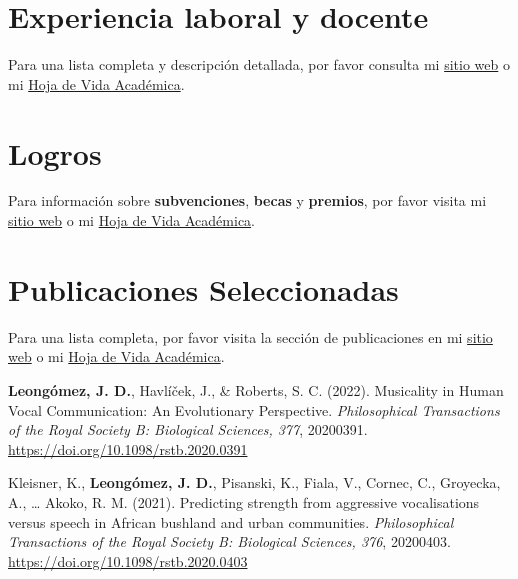 \documentclass[11pt,a4paper,]{awesome-cv}
\begin{document}
\hypertarget{experiencia-laboral-y-docente}{%
\section{Experiencia laboral y
docente}\label{experiencia-laboral-y-docente}}

Para una lista completa y descripción detallada, por favor consulta mi
\href{https://jdleongomez.info/es/profile/\#experience}{sitio web} o mi
\href{https://jdleongomez.info/es/files/jdl_cv_es.pdf}{Hoja de Vida
Académica}.

\begin{cventries}
    \vspace{-4.0mm}
\end{cventries}

\hypertarget{logros}{%
\section{Logros}\label{logros}}

Para información sobre \textbf{subvenciones}, \textbf{becas} y
\textbf{premios}, por favor visita mi
\href{https://jdleongomez.info/es/profile/\#accomplishments}{sitio web}
o mi \href{https://jdleongomez.info/es/files/jdl_cv_es.pdf}{Hoja de Vida
Académica}.

\hypertarget{publicaciones-seleccionadas}{%
\section{Publicaciones
Seleccionadas}\label{publicaciones-seleccionadas}}

Para una lista completa, por favor visita la sección de publicaciones en
mi \href{https://jdleongomez.info/es/publication/}{sitio web} o mi
\href{https://jdleongomez.info/es/files/jdl_cv_es.pdf}{Hoja de Vida
Académica}.

\begingroup
\setlength{\parindent}{-0.5in}
\setlength{\leftskip}{0.5in}

\textbf{Leongómez, J. D.}, Havlíček, J., \& Roberts, S. C. (2022).
Musicality in Human Vocal Communication: An Evolutionary Perspective.
\emph{Philosophical Transactions of the Royal Society B: Biological
Sciences, 377}, 20200391. \url{https://doi.org/10.1098/rstb.2020.0391}

Kleisner, K., \textbf{Leongómez, J. D.}, Pisanski, K., Fiala, V.,
Cornec, C., Groyecka, A., \ldots{} Akoko, R. M. (2021). Predicting
strength from aggressive vocalisations versus speech in African bushland
and urban communities. \emph{Philosophical Transactions of the Royal
Society B: Biological Sciences, 376}, 20200403.
\url{https://doi.org/10.1098/rstb.2020.0403}
\end{document}
